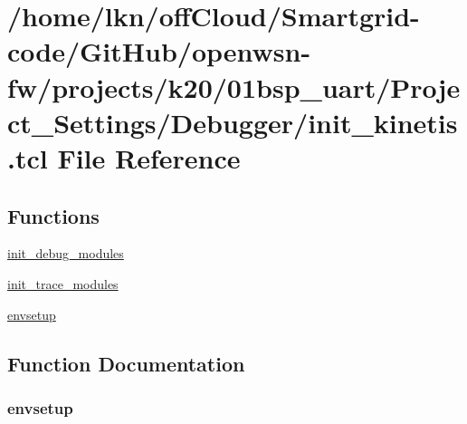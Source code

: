 \hypertarget{01bsp__uart_2_project___settings_2_debugger_2init__kinetis_8tcl}{}\section{/home/lkn/off\+Cloud/\+Smartgrid-\/code/\+Git\+Hub/openwsn-\/fw/projects/k20/01bsp\+\_\+uart/\+Project\+\_\+\+Settings/\+Debugger/init\+\_\+kinetis.tcl File Reference}
\label{01bsp__uart_2_project___settings_2_debugger_2init__kinetis_8tcl}
\subsection*{Functions}
\begin{DoxyCompactItemize}
\item 
\hyperlink{01bsp__uart_2_project___settings_2_debugger_2init__kinetis_8tcl_a10c80471835dee84e7652764cecbb722}{init\+\_\+debug\+\_\+modules}
\item 
\hyperlink{01bsp__uart_2_project___settings_2_debugger_2init__kinetis_8tcl_a8ecf61d10da6f21c5b31426f9a235e03}{init\+\_\+trace\+\_\+modules}
\item 
\hyperlink{01bsp__uart_2_project___settings_2_debugger_2init__kinetis_8tcl_a7f6b4cebda44b6e9d42cc7879ee95e8e}{envsetup}
\end{DoxyCompactItemize}


\subsection{Function Documentation}
\subsubsection[{\texorpdfstring{envsetup}{envsetup}}]{\setlength{\rightskip}{0pt plus 5cm}envsetup}\hypertarget{01bsp__uart_2_project___settings_2_debugger_2init__kinetis_8tcl_a7f6b4cebda44b6e9d42cc7879ee95e8e}{}\label{01bsp__uart_2_project___settings_2_debugger_2init__kinetis_8tcl_a7f6b4cebda44b6e9d42cc7879ee95e8e}


